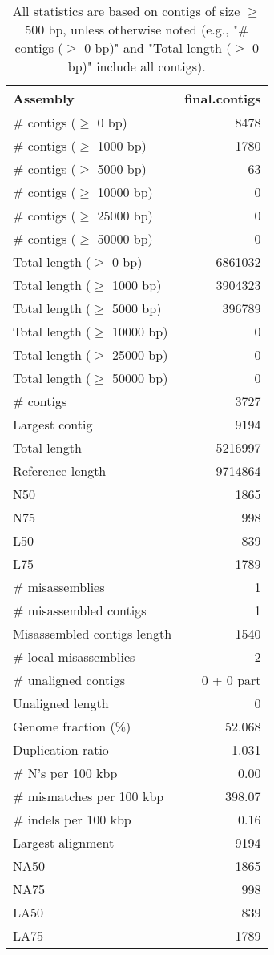 \documentclass[12pt,a4paper]{article}
\begin{document}
\begin{table}[ht]
\begin{center}
\caption{All statistics are based on contigs of size $\geq$ 500 bp, unless otherwise noted (e.g., "\# contigs ($\geq$ 0 bp)" and "Total length ($\geq$ 0 bp)" include all contigs).}
\begin{tabular}{|l*{1}{|r}|}
\hline
Assembly & final.contigs \\ \hline
\# contigs ($\geq$ 0 bp) & 8478 \\ \hline
\# contigs ($\geq$ 1000 bp) & 1780 \\ \hline
\# contigs ($\geq$ 5000 bp) & 63 \\ \hline
\# contigs ($\geq$ 10000 bp) & 0 \\ \hline
\# contigs ($\geq$ 25000 bp) & 0 \\ \hline
\# contigs ($\geq$ 50000 bp) & 0 \\ \hline
Total length ($\geq$ 0 bp) & 6861032 \\ \hline
Total length ($\geq$ 1000 bp) & 3904323 \\ \hline
Total length ($\geq$ 5000 bp) & 396789 \\ \hline
Total length ($\geq$ 10000 bp) & 0 \\ \hline
Total length ($\geq$ 25000 bp) & 0 \\ \hline
Total length ($\geq$ 50000 bp) & 0 \\ \hline
\# contigs & 3727 \\ \hline
Largest contig & 9194 \\ \hline
Total length & 5216997 \\ \hline
Reference length & 9714864 \\ \hline
N50 & 1865 \\ \hline
N75 & 998 \\ \hline
L50 & 839 \\ \hline
L75 & 1789 \\ \hline
\# misassemblies & 1 \\ \hline
\# misassembled contigs & 1 \\ \hline
Misassembled contigs length & 1540 \\ \hline
\# local misassemblies & 2 \\ \hline
\# unaligned contigs & 0 + 0 part \\ \hline
Unaligned length & 0 \\ \hline
Genome fraction (\%) & 52.068 \\ \hline
Duplication ratio & 1.031 \\ \hline
\# N's per 100 kbp & 0.00 \\ \hline
\# mismatches per 100 kbp & 398.07 \\ \hline
\# indels per 100 kbp & 0.16 \\ \hline
Largest alignment & 9194 \\ \hline
NA50 & 1865 \\ \hline
NA75 & 998 \\ \hline
LA50 & 839 \\ \hline
LA75 & 1789 \\ \hline
\end{tabular}
\end{center}
\end{table}
\end{document}
